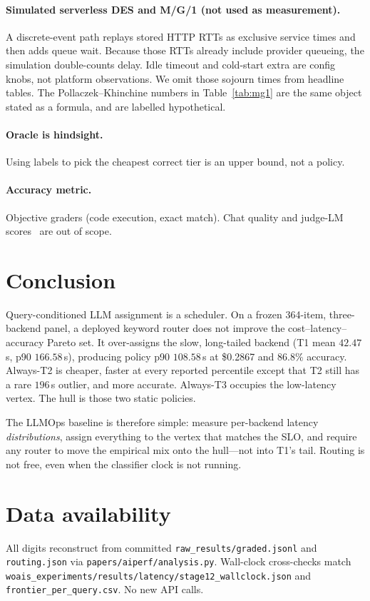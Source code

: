 \documentclass[10pt,conference]{IEEEtran}
\begin{document}
\paragraph{Simulated serverless DES and M/G/1 (not used as measurement).}
A discrete-event path replays stored HTTP RTTs as exclusive service times and then adds queue wait. Because those RTTs already include provider queueing, the simulation double-counts delay. Idle timeout and cold-start extra are config knobs, not platform observations. We omit those sojourn times from headline tables. The Pollaczek--Khinchine numbers in Table~\ref{tab:mg1} are the same object stated as a formula, and are labelled hypothetical.

\paragraph{Oracle is hindsight.}
Using labels to pick the cheapest correct tier is an upper bound, not a policy.

\paragraph{Accuracy metric.}
Objective graders (code execution, exact match). Chat quality and judge-LM scores~\cite{stoica2024lmsys} are out of scope.

\section{Conclusion}

Query-conditioned LLM assignment is a scheduler. On a frozen 364-item, three-backend panel, a deployed keyword router does not improve the cost--latency--accuracy Pareto set. It over-assigns the slow, long-tailed backend (T1 mean $42.47$\,s, p90 $166.58$\,s), producing policy p90 $108.58$\,s at \$0.2867 and $86.8\%$ accuracy. Always-T2 is cheaper, faster at every reported percentile except that T2 still has a rare $196$\,s outlier, and more accurate. Always-T3 occupies the low-latency vertex. The hull is those two static policies.

The LLMOps baseline is therefore simple: measure per-backend latency \emph{distributions}, assign everything to the vertex that matches the SLO, and require any router to move the empirical mix onto the hull---not into T1's tail. Routing is not free, even when the classifier clock is not running.

\section*{Data availability}
All digits reconstruct from committed \texttt{raw\_results/graded.jsonl} and \texttt{routing.json} via \texttt{papers/aiperf/analysis.py}. Wall-clock cross-checks match \texttt{woais\_experiments/results/latency/stage12\_wallclock.json} and \texttt{frontier\_per\_query.csv}. No new API calls.



\end{document}

